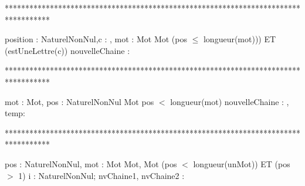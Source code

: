 ***********************************************************************************
\begin{algorithme}%
       {position : NaturelNonNul,c : \caractere, mot : Mot}%
       {Mot}%
       {(pos $\leq$ longueur(mot))) ET (estUneLettre(c))}
       {nouvelleChaine : \chaine}
       {
       }
\end{algorithme}

***********************************************************************************
\begin{algorithme}%
      {mot : Mot, pos : NaturelNonNul}%
      {Mot}%
      {pos $<$ longueur(mot)}%
      {nouvelleChaine : \chaine, temp: \caractere }%
      {
      }
\end{algorithme}

***********************************************************************************
\begin{algorithme}
         {pos : NaturelNonNul, mot : Mot}%
         {Mot, Mot}%
         {(pos $<$ longueur(unMot)) ET (pos $>$ 1)}%
         {i : NaturelNonNul; nvChaine1, nvChaine2 : \chaine}%
         {
            {
            }
            {
            }
          }
\end{algorithme}
